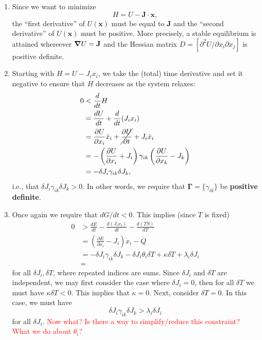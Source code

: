 \documentclass{article}
\theoremstyle{definition}
\newcommand{\p}{\partial}
\newcommand{\f}[2]{\frac{#1}{#2}}
\newcommand{\lp}{\left(}
\newcommand{\rp}{\right)}
\begin{document}
\begin{enumerate}[label=(\alph*)]
	\item Since we want to minimize  
	\begin{equation*}
	H = U - \mathbf{J}\cdot \mathbf{x},
	\end{equation*}
	the ``first derivative'' of $U(\mathbf{x})$ must be equal to $\mathbf{J}$ and the ``second derivative'' of $U(\mathbf{x})$ must be positive. More precisely, a stable equilibrium is attained whereever $\grad U = \mathbf{J}$ and the Hessian matrix $D = [\p^2 U /\p x_i \p x_j]$ is positive definite. 
	
	
	\item Starting with $H = U - J_i x_i$, we take the (total) time derivative and set it negative to ensure that $H$ decreases as the system relaxes:
	\begin{align*}
	0 &< \f{d}{dt}H \\
	&= \f{dU}{dt}   + \f{d}{dt}(J_i x_i) \\
	&= \f{\p U}{\p x_i}\dot{x}_i + \cancel{\f{\p U}{\p t}} + J_i \dot{x}_i\\
	&= -\lp \f{\p U}{\p x_i} + J_i \rp \gamma_{ik} \lp \f{\p U}{\p x_k} - J_k \rp\\
	&= -\delta J_i \gamma_{ik} \delta J_k,
	\end{align*}
	i.e., that $\delta J_i \gamma_{ik} \delta J_k > 0$. In other words, we require that $\mathbf{\Gamma} = \{ \gamma_{ik}\}$ be \textbf{positive definite}. 
	
	
	
	\item Once again we require that $dG/dt < 0$. This implies (since $T$ is fixed)
	\begin{align*}
	0 &>  \f{dE}{dt} -\f{d(J_i x_i)}{dt} - \f{d(TS)}{dT} \\
	&= \lp \f{\p E}{\p x_i} - J_i\rp \dot{x}_i - \dot{Q}\\  
	&= -\delta J_i\gamma_{ik} \delta J_k - \delta J_i \theta_i \delta T + \kappa \delta T + \lambda_i \delta J_i\\
	&= 
	\end{align*}
	for all $\delta J_i, \delta T$, where repeated indices are sums. Since $\delta J_i$ and $\delta T$ are independent, we may first 
	consider the case where $\delta J_i = 0$, then for all $\delta T$ we must have $\kappa \delta T < 0$. This implies that $\boxed{\kappa = 0}$. Next, consider $\delta T =0$. In this case, we must have
	\begin{equation*}
	\delta J_i \gamma_{ik} \delta J_k > \lambda_i \delta J_i
	\end{equation*}
	for all $\delta J_i$. \textcolor{red}{Now what? Is there a way to simplify/reduce this constraint? What we do about $\theta_i$?}
\end{enumerate}
\end{document}
